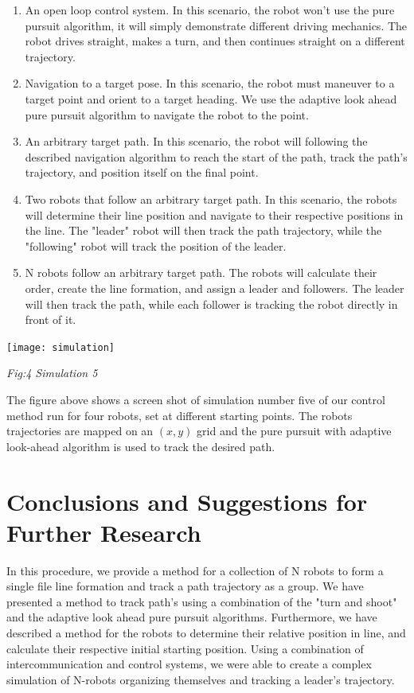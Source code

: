 \documentclass[journal]{IEEEtran}
\begin{document}
    \begin{enumerate}
        \item An open loop control system. In this scenario, the robot won't use the pure pursuit algorithm, it will simply demonstrate different driving mechanics. The robot drives straight, makes a turn, and then continues straight on a different trajectory.
        \item Navigation to a target pose. In this scenario, the robot must maneuver to a target point and orient to a target heading. We use the adaptive look ahead pure pursuit algorithm to navigate the robot to the point.  
        \item An arbitrary target path. In this scenario, the robot will following the described navigation algorithm to reach the start of the path, track the path's trajectory, and position itself on the final point.  
        \item Two robots that follow an arbitrary target path. In this scenario, the robots will determine their line position and navigate to their respective positions in the line. The "leader" robot will then track the path trajectory, while the "following" robot will track the position of the leader.
        \item N robots follow an arbitrary target path. The robots will calculate their order, create the line formation, and assign a leader and followers. The leader will then track the path, while each follower is tracking the robot directly in front of it.\\
    \end{enumerate}
    
    \centerline{\texttt{[image: simulation]}}
    \centerline{\textit{Fig:4 Simulation 5}}
    
    The figure above shows a screen shot of simulation number five of our control method run for four robots, set at different starting points. The robots trajectories are mapped on an $\left(x,y\right)$ grid and the pure pursuit with adaptive look-ahead algorithm is used to track the desired path.

\section{Conclusions and Suggestions for Further Research}
    In this procedure, we provide a method for a collection of N robots to form a single file line formation and track a path trajectory as a group. We have presented a method to track path's using a combination of the "turn and shoot" and the adaptive look ahead pure pursuit algorithms. Furthermore, we have described a method for the robots to determine their relative position in line, and calculate their respective initial starting position. Using a combination of intercommunication and control systems, we were able to create a complex simulation of N-robots organizing themselves and tracking a leader's trajectory.
    
\end{document}
